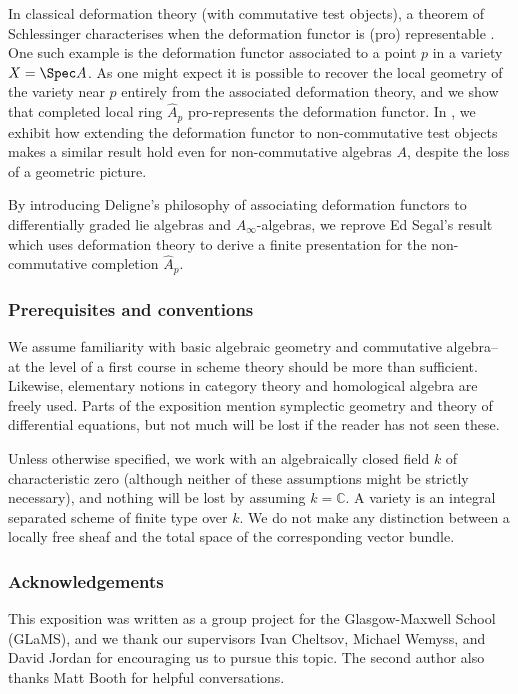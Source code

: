 In classical deformation theory (with commutative test objects), a theorem
of Schlessinger characterises when the deformation functor is (pro) representable
\cite[the result is discussed in][Section 16]{hartshorne_deformation_2010}. One
such example is the deformation functor associated to a point \(p\) in a variety
\(X=\Spec A\). As one might expect it is possible to recover the local geometry
of the variety near \(p\) entirely from the associated deformation theory, and
we show that completed local ring \(\widehat{A}_p\) pro-represents the
deformation functor. In , we exhibit how
extending the deformation functor to non-commutative test objects makes a
similar result hold even for non-commutative algebras \(A\), despite the loss of
a geometric picture. 

By introducing Deligne's philosophy of associating deformation functors to
differentially graded lie algebras and \(A_\infty\)-algebras, we reprove Ed
Segal's result which uses deformation theory to derive a finite presentation for
the non-commutative completion \(\widehat{A}_p\). 

\subsubsection{Prerequisites and conventions} We assume familiarity with basic
algebraic geometry and commutative algebra--  at the level of a first course in
scheme theory \cite[such as][chapter II]{harts} should be more than sufficient.
Likewise, elementary notions in category theory and homological algebra are
freely used. Parts of the exposition mention symplectic geometry and theory of
differential equations, but not much will be lost if the reader has not seen
these.

Unless otherwise specified, we work with an algebraically closed field \(k\) of
characteristic zero (although neither of these assumptions might be strictly
necessary), and nothing will be lost by assuming \(k=\mathbb{C}\). A variety is
an integral separated scheme of finite type over \(k\).  We do not make any
distinction between a locally free sheaf and the total space of the
corresponding vector bundle.

\subsubsection{Acknowledgements} This exposition was written as a group project
for the Glasgow-Maxwell School (GLaMS), and we thank our supervisors Ivan
Cheltsov, Michael Wemyss, and David Jordan for encouraging us to pursue this
topic. The second author also thanks Matt Booth for helpful conversations. 

